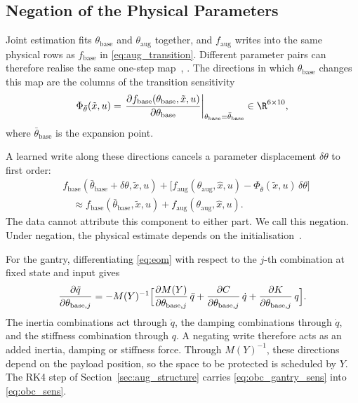 \subsection{Negation of the Physical Parameters}\label{sec:obc_negation}
Joint estimation fits $\theta_{\mathrm{base}}$ and $\theta_{\mathrm{aug}}$
together, and $f_{\mathrm{aug}}$ writes into the same physical rows as
$f_{\mathrm{base}}$ in \eqref{eq:aug_transition}.
Different parameter pairs can therefore realise the same one-step
map~\cite[Ex.~2]{gyorok2026obc}, \cite[Ex.~1]{gyorok2025l4dc}.
The directions in which $\theta_{\mathrm{base}}$ changes this map are the
columns of the transition sensitivity
\begin{equation}
 \Phi_{\bar\theta}(\tilde x,u)
 =\left.\frac{\partial f_{\mathrm{base}}(\theta_{\mathrm{base}},\tilde x,u)}
   {\partial\theta_{\mathrm{base}}}\right|_{\theta_{\mathrm{base}}=\bar\theta_{\mathrm{base}}}
   \in\R^{6\times10},
\label{eq:obc_sens}
\end{equation}
where $\bar\theta_{\mathrm{base}}$ is the expansion point.

A learned write along these directions cancels a parameter displacement
$\delta\theta$ to first order:
\begin{equation}
\begin{aligned}
 &f_{\mathrm{base}}(\bar\theta_{\mathrm{base}}+\delta\theta,\tilde x,u)
 +\bigl[f_{\mathrm{aug}}(\theta_{\mathrm{aug}},\hat x,u)
 -\Phi_{\bar\theta}(\tilde x,u)\,\delta\theta\bigr]\\
 &\quad\approx f_{\mathrm{base}}(\bar\theta_{\mathrm{base}},\tilde x,u)
 +f_{\mathrm{aug}}(\theta_{\mathrm{aug}},\hat x,u).
\end{aligned}
\label{eq:obc_negation}
\end{equation}
The data cannot attribute this component to either part.
We call this negation.
Under negation, the physical estimate depends on the
initialisation~\cite[Sec.~5.1]{gyorok2026obc}.

For the gantry, differentiating \eqref{eq:eom} with respect to the $j$-th
combination at fixed state and input gives
\begin{equation}
 \frac{\partial\ddot q}{\partial\theta_{\mathrm{base},j}}
 =-M(Y)^{-1}\Bigl[\frac{\partial M(Y)}{\partial\theta_{\mathrm{base},j}}\,\ddot q
 +\frac{\partial C}{\partial\theta_{\mathrm{base},j}}\,\dot q
 +\frac{\partial K}{\partial\theta_{\mathrm{base},j}}\,q\Bigr].
\label{eq:obc_gantry_sens}
\end{equation}
The inertia combinations act through $\ddot q$, the damping combinations
through $\dot q$, and the stiffness combination through $q$.
A negating write therefore acts as an added inertia, damping or stiffness
force.
Through $M(Y)^{-1}$, these directions depend on the payload position, so the
space to be protected is scheduled by $Y$.
The RK4 step of Section~\ref{sec:aug_structure} carries
\eqref{eq:obc_gantry_sens} into \eqref{eq:obc_sens}.

